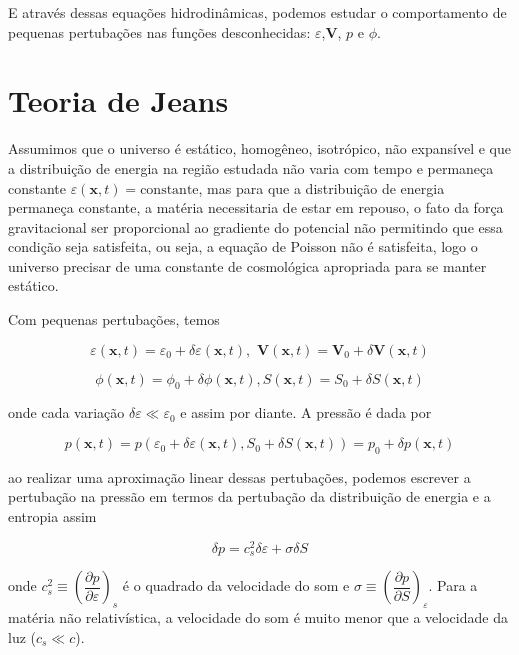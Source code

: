 E através dessas equações hidrodinâmicas, podemos estudar o comportamento de pequenas pertubações nas funções desconhecidas: $ \varepsilon $,$ \textbf{V} $, $ p $ e $ \phi $.

\section*{Teoria de Jeans}

Assumimos que o universo é estático, homogêneo, isotrópico, não expansível e que a distribuição de energia na região estudada não varia com tempo e permaneça constante $\varepsilon (\mathbf{x},t) = \text{constante}$, mas para que a distribuição de energia permaneça constante, a matéria necessitaria de estar em repouso, o fato da força gravitacional ser proporcional ao gradiente do potencial não permitindo que essa condição seja satisfeita, ou seja, a equação de Poisson não é satisfeita, logo o universo precisar de uma constante de cosmológica apropriada para se manter estático.

Com pequenas pertubações, temos

\begin{equation}\label{eq9}
	\varepsilon (\textbf{x},t) = \varepsilon_0 + \delta\varepsilon (\textbf{x},t),\,\, \textbf{V} (\textbf{x},t) = \textbf{V}_0 +\delta\textbf{V} (\textbf{x},t) 
\end{equation}

$$\phi (\textbf{x},t) = \phi_0 + \delta\phi (\textbf{x},t), S (\textbf{x},t)= S_0 + \delta S (\textbf{x},t)$$

onde cada variação $\delta\varepsilon \ll \varepsilon_0$ e assim por diante. A pressão é dada por

\begin{equation}\label{eq10}
	p (\textbf{x},t) = p( \varepsilon_0 + \delta\varepsilon (\textbf{x},t), S_0 + \delta S (\textbf{x},t) ) = p_0 +\delta p (\textbf{x},t) 
\end{equation}

ao realizar uma aproximação linear dessas pertubações, podemos escrever a pertubação na pressão em termos da pertubação da distribuição de energia e a entropia assim

\begin{equation}\label{eq11}
	\delta p = c_s^2\delta\varepsilon + \sigma\delta S
\end{equation}

onde $c^2_s \equiv \left(\dfrac{\partial p}{\partial\varepsilon}\right)_s$ é o quadrado da velocidade do som e $\sigma \equiv \left(\dfrac{\partial p}{\partial S}\right)_\varepsilon$. Para a matéria não relativística, a velocidade do som é muito menor que a velocidade da luz ($c_s \ll c  $).

